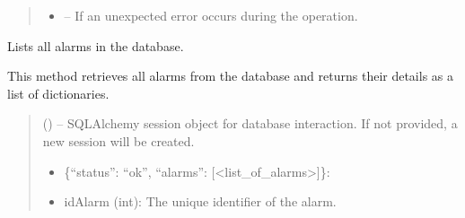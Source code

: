 \documentclass[letterpaper,10pt,english]{sphinxmanual}
\begin{document}
\begin{fulllineitems}
\begin{fulllineitems}
\begin{quote}
\begin{description}
\begin{itemize}
\item {} 
\sphinxAtStartPar
{} – If an unexpected error occurs during the operation.

\end{itemize}

\end{description}\end{quote}

\end{fulllineitems}


\begin{fulllineitems}
\label{\detokenize{app.controllers:app.controllers.alarm_controller.AlarmController.list_alarms}}
\pysigstartsignatures
\pysiglinewithargsret
{}
{}
{}
\pysigstopsignatures
\sphinxAtStartPar
Lists all alarms in the database.

\sphinxAtStartPar
This method retrieves all alarms from the database and returns their details
as a list of dictionaries.
\begin{quote}\begin{description}
\sphinxAtStartPar
{} (\sphinxstyleliteralemphasis{\sphinxupquote{, }}) – SQLAlchemy session object for database interaction.
If not provided, a new session will be created.

\sphinxAtStartPar
\begin{description}
\begin{itemize}
\item {} 
\sphinxAtStartPar
\{“status”: “ok”, “alarms”: {[}<list\_of\_alarms>{]}\}:

\end{itemize}
\begin{description}
\begin{itemize}
\item {} 
\sphinxAtStartPar
idAlarm (int): The unique identifier of the alarm.


\end{itemize}
\end{description}
\end{description}
\end{description}
\end{quote}
\end{fulllineitems}
\end{fulllineitems}
\end{document}
